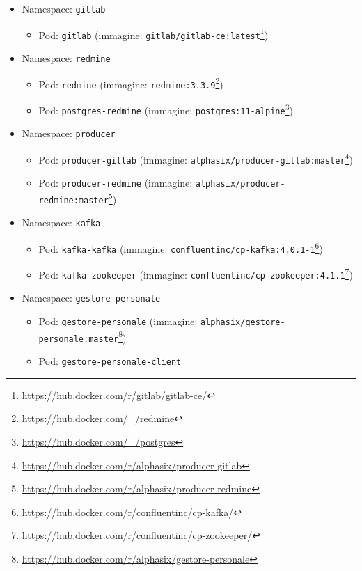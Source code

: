 \begin{itemize}
	\item Namespace: \texttt{gitlab}
	\begin{itemize}
		\item Pod: \texttt{gitlab} (immagine: \texttt{gitlab/gitlab-ce:latest}\footnote{\url{https://hub.docker.com/r/gitlab/gitlab-ce/}})%
	\end{itemize}

	\item Namespace: \texttt{redmine}
	\begin{itemize}
		\item Pod: \texttt{redmine} (immagine: \texttt{redmine:3.3.9}\footnote{\url{https://hub.docker.com/_/redmine}})
		\item Pod: \texttt{postgres-redmine} (immagine: \texttt{postgres:11-alpine}\footnote{\url{https://hub.docker.com/_/postgres}})
	\end{itemize}

	\item Namespace: \texttt{producer}
	\begin{itemize}
		\item Pod: \texttt{producer-gitlab} (immagine: \texttt{alphasix/producer-gitlab:master}\footnote{\url{https://hub.docker.com/r/alphasix/producer-gitlab}})
		\item Pod: \texttt{producer-redmine} (immagine: \texttt{alphasix/producer-redmine:master}\footnote{\url{https://hub.docker.com/r/alphasix/producer-redmine}})
	\end{itemize}

	\item Namespace: \texttt{kafka}
	\begin{itemize}
		\item Pod: \texttt{kafka-kafka} (immagine: \texttt{confluentinc/cp-kafka:4.0.1-1}\footnote{\url{https://hub.docker.com/r/confluentinc/cp-kafka/}})
		\item Pod: \texttt{kafka-zookeeper} (immagine: \texttt{confluentinc/cp-zookeeper:4.1.1}\footnote{\url{https://hub.docker.com/r/confluentinc/cp-zookeeper/}})
	\end{itemize}

	\item Namespace: \texttt{gestore-personale}
	\begin{itemize}
		\item Pod: \texttt{gestore-personale} (immagine: \texttt{alphasix/gestore-personale:master}\footnote{\url{https://hub.docker.com/r/alphasix/gestore-personale}})
		\item Pod: \texttt{gestore-personale-client}


\end{itemize}
\end{itemize}
